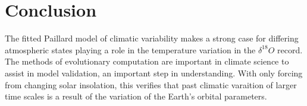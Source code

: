\section{Conclusion}

The fitted Paillard model of climatic variability makes a strong case for differing atmospheric states playing a role in the temperature variation in the $\delta ^{18} O$ record.
The methods of evolutionary computation are important in climate science to assist in model validation, an important step in understanding.
With only forcing from changing solar insolation, this verifies that past climatic varaition of larger time scales is a result of the variation of the Earth's orbital parameters.



